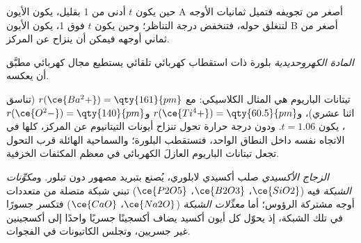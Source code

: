 حين يكون $t$ أدنى من 1 بقليل، يكون الأيون A أصغر من تجويفه فتميل
ثمانيات الأوجه لتنغلق حوله، فتنخفض درجة التناظر؛ وحين يكون $t$ فوق 1،
يكون الأيون B أصغر من ثماني أوجهه فيمكن أن ينزاح عن المركز.

\begin{definition}\label{def:b3:inorganic-materials:ferroelectric}
\emph{المادة الكهروحديدية} بلورة ذات استقطاب
كهربائي تلقائي يستطيع مجال كهربائي مطبَّق أن يعكسه.
\end{definition}

تيتانات الباريوم هي المثال الكلاسيكي: مع $r(\ce{Ba^2+}) = \qty{161}{pm}$ (تناسق اثنا عشري)،
و$r(\ce{Ti^4+}) = \qty{60.5}{pm}$ و$r(\ce{O^2-}) = \qty{140}{pm}$، يكون $t = 1.06$. ودون درجة حرارة تحول تنزاح
أيونات التيتانيوم عن المركز، كلها في الاتجاه نفسه داخل النطاق الواحد،
فتستقطب البلورة؛ والسماحية الهائلة قرب التحول تجعل
تيتانات الباريوم العازلَ الكهربائي في معظم المكثفات الخزفية.

\begin{definition}\label{def:b3:inorganic-materials:glass}
\emph{الزجاج الأكسيدي} صلب أكسيدي لابلوري، يُصنع
بتبريد مصهور دون تبلور. و\emph{مكوِّنات
الشبكة} فيه ($\ce{SiO2}$، $\ce{B2O3}$، $\ce{P2O5}$) تبني شبكة متصلة من
متعددات أوجه مشتركة الرؤوس؛ أما \emph{معدِّلات الشبكة}
($\ce{Na2O}$، $\ce{CaO}$) فتكسر جسورًا في تلك الشبكة، إذ يحوّل كل أيون أكسيد يضاف
أكسجينًا جسريًا واحدًا إلى أكسجينين غير جسريين، وتجلس الكاتيونات في
الفجوات.
\end{definition}

